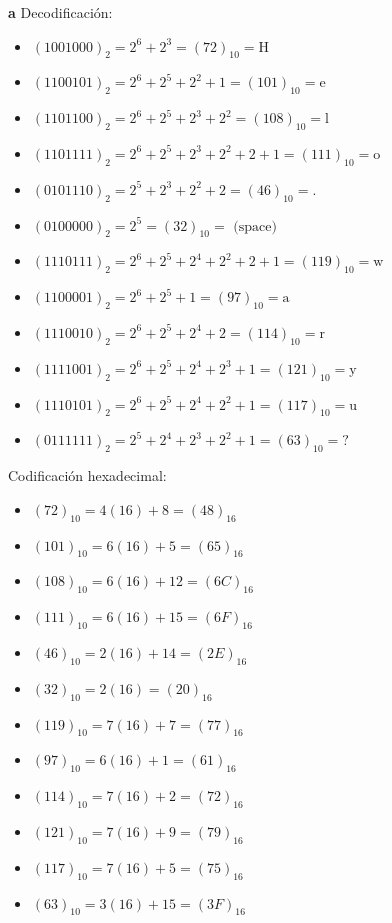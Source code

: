 \documentclass{article}
\newenvironment{solution}[1][Solución]{\begin{trivlist}
\item[\hskip \labelsep {\bfseries #1:}]}{\end{trivlist}}
\begin{document}
\begin{solution}{\textbf{a} Decodificación:}
\begin{itemize}
    \item $(1001000)_{2} = 2^{6} + 2^{3} = (72)_{10} = \text{H}$ 
    \item $(1100101)_{2} = 2^{6} + 2^{5} + 2^{2} + 1 = (101)_{10} = \text{e}$
    \item $(1101100)_{2} = 2^{6} + 2^{5} + 2^{3} + 2^{2} = (108)_{10} = \text{l}$
    \item $(1101111)_{2} = 2^{6} + 2^{5} + 2^{3} + 2^{2} + 2 + 1 = (111)_{10} = \text{o}$
    \item $(0101110)_{2} = 2^{5} + 2^{3} + 2^{2} + 2 = (46)_{10} = \text{.}$
    \item $(0100000)_{2} = 2^{5} = (32)_{10} = \text{ (space)}$
    \item $(1110111)_{2} = 2^{6} + 2^{5} + 2^{4} + 2^{2} + 2 + 1 = (119)_{10} = \text{w}$
    \item $(1100001)_{2} = 2^{6} + 2^{5} + 1 = (97)_{10} = \text{a}$
    \item $(1110010)_{2} = 2^{6} + 2^{5} + 2^{4} + 2 = (114)_{10} = \text{r}$
    \item $(1111001)_{2} = 2^{6} + 2^{5} + 2^{4} + 2^{3} + 1 = (121)_{10} = \text{y}$
    \item $(1110101)_{2} = 2^{6} + 2^{5} + 2^{4} + 2^{2} + 1 = (117)_{10} = \text{u}$
    \item $(0111111)_{2} = 2^{5} + 2^{4} + 2^{3} + 2^{2} + 1 = (63)_{10} = \text{?}$
\end{itemize}

\begin{center}
\end{center}

 Codificación hexadecimal:
\begin{itemize}
    \item  $ (72)_{10}  = 4(16) + 8 = (48)_{16}$
    \item  $ (101)_{10} = 6(16) + 5 = (65)_{16}$
    \item  $ (108)_{10} = 6(16) + 12 = (6C)_{16}$
    \item  $ (111)_{10} = 6(16) + 15 = (6F)_{16}$
    \item  $ (46)_{10}  = 2(16) + 14 = (2E)_{16}$
    \item  $ (32)_{10}  = 2(16) = (20)_{16}$
    \item  $ (119)_{10} = 7(16) + 7 = (77)_{16}$
    \item  $ (97)_{10}  = 6(16) + 1 = (61)_{16}$
    \item  $ (114)_{10} = 7(16) + 2 = (72)_{16}$
    \item  $ (121)_{10} = 7(16) + 9 = (79)_{16}$
    \item  $ (117)_{10} = 7(16) + 5 = (75)_{16}$
    \item  $ (63)_{10}  = 3(16) + 15 = (3F)_{16}$
\end{itemize}


\end{solution}
\end{document}
